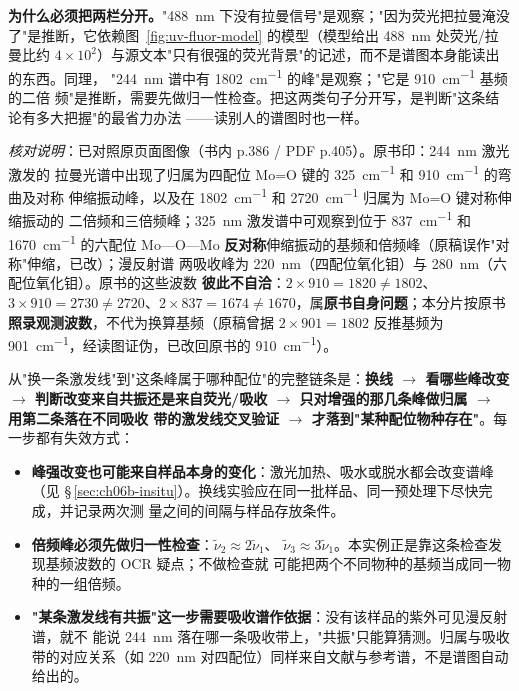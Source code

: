 \textbf{为什么必须把两栏分开。}"\qty{488}{nm} 下没有拉曼信号"是观察；"因为荧光把拉曼淹没
了"是推断，它依赖图~\ref{fig:uv-fluor-model} 的模型（模型给出 \qty{488}{nm} 处荧光/拉曼比约
$4\times10^2$）与源文本"只有很强的荧光背景"的记述，而不是谱图本身能读出的东西。同理，
"\qty{244}{nm} 谱中有 \qty{1802}{cm^{-1}} 的峰"是观察；"它是 \qty{910}{cm^{-1}} 基频的二倍
频"是推断，需要先做归一性检查。把这两类句子分开写，是判断"这条结论有多大把握"的最省力办法
——读别人的谱图时也一样。

\emph{核对说明}：已对照原页面图像（书内 p.386 / PDF p.405）。原书印：\qty{244}{nm} 激光激发的
拉曼光谱中出现了归属为四配位 Mo=O 键的 \qty{325}{cm^{-1}} 和 \qty{910}{cm^{-1}} 的弯曲及对称
伸缩振动峰，以及在 \qty{1802}{cm^{-1}} 和 \qty{2720}{cm^{-1}} 归属为 Mo=O 键对称伸缩振动的
二倍频和三倍频峰；\qty{325}{nm} 激发谱中可观察到位于 \qty{837}{cm^{-1}} 和 \qty{1670}{cm^{-1}}
的六配位 Mo—O—Mo \textbf{反对称}伸缩振动的基频和倍频峰（原稿误作"对称"伸缩，已改）；漫反射谱
两吸收峰为 \qty{220}{nm}（四配位氧化钼）与 \qty{280}{nm}（六配位氧化钼）。原书的这些波数
\textbf{彼此不自洽}：$2\times910=1820\neq1802$、$3\times910=2730\neq2720$、$2\times837=1674
\neq1670$，属\textbf{原书自身问题}；本分片按原书\textbf{照录观测波数}，不代为换算基频（原稿曾据
$2\times901=1802$ 反推基频为 \qty{901}{cm^{-1}}，经读图证伪，已改回原书的 \qty{910}{cm^{-1}}）。

\begin{dataflow}
从"换一条激发线"到"这条峰属于哪种配位"的完整链条是：\textbf{换线 $\to$ 看哪些峰改变 $\to$
判断改变来自共振还是来自荧光/吸收 $\to$ 只对增强的那几条峰做归属 $\to$ 用第二条落在不同吸收
带的激发线交叉验证 $\to$ 才落到"某种配位物种存在"}。每一步都有失效方式：
\begin{itemize}
\item \textbf{峰强改变也可能来自样品本身的变化}：激光加热、吸水或脱水都会改变谱峰（见
  \S\,\ref{sec:ch06b-insitu}）。换线实验应在同一批样品、同一预处理下尽快完成，并记录两次测
  量之间的间隔与样品存放条件。
\item \textbf{倍频峰必须先做归一性检查}：$\tilde\nu_2\approx2\tilde\nu_1$、
  $\tilde\nu_3\approx3\tilde\nu_1$。本实例正是靠这条检查发现基频波数的 OCR 疑点；不做检查就
  可能把两个不同物种的基频当成同一物种的一组倍频。
\item \textbf{"某条激发线有共振"这一步需要吸收谱作依据}：没有该样品的紫外可见漫反射谱，就不
  能说 \qty{244}{nm} 落在哪一条吸收带上，"共振"只能算猜测。归属与吸收带的对应关系（如
  \qty{220}{nm} 对四配位）同样来自文献与参考谱，不是谱图自动给出的。
\end{itemize}
\end{dataflow}

